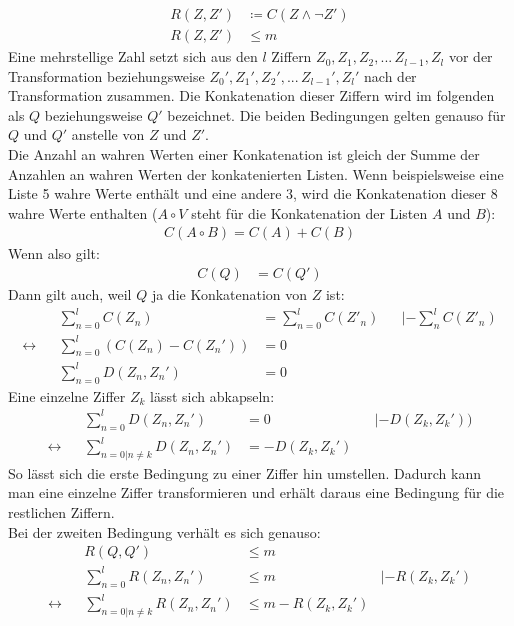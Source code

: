 \documentclass[a4paper,10pt,ngerman]{scrartcl}
\begin{document}
\begin{align}
R(Z, Z') &\coloneqq C(Z \land \neg Z') \\
R(Z, Z')&\leq m
\end{align}
Eine mehrstellige Zahl setzt sich aus den $l$ Ziffern $Z_0, Z_1, Z_2, ... \,Z_{l-1}, Z_l$ vor der Transformation beziehungsweise $Z_0', Z_1', Z_2', ... \,Z_{l-1}', Z_l'$ nach der Transformation zusammen.
Die Konkatenation dieser Ziffern wird im folgenden als $Q$ beziehungsweise $Q'$ bezeichnet. Die beiden Bedingungen gelten genauso für $Q$ und $Q'$ anstelle von $Z$ und $Z'$. \\
Die Anzahl an wahren Werten einer Konkatenation ist gleich der Summe der Anzahlen an wahren Werten der konkatenierten Listen. Wenn beispielsweise eine Liste 5 wahre Werte enthält und eine andere 3, wird die Konkatenation dieser 8 wahre Werte enthalten ($A\circ V$ steht für die Konkatenation der Listen $A$ und $B$):
\begin{align}
C(A \circ B) = C(A) + C(B)
\end{align}
Wenn also gilt:
\begin{align}
C(Q) &= C(Q')
\end{align}
Dann gilt auch, weil $Q$ ja die Konkatenation von $Z$ ist:
\begin{align}
&&\sum_{n=0}^l C(Z_n) &= \sum_{n=0}^l C(Z'_n)&& |-\sum_n^l C(Z'_n) \\
\leftrightarrow && \sum_{n=0}^l (C(Z_n) - C(Z_n')) &= 0 && \\
&& \sum_{n=0}^l D(Z_n, Z_n') &= 0 
\end{align}
Eine einzelne Ziffer $Z_k$ lässt sich abkapseln:
\begin{align}
&& \sum_{n=0}^l D(Z_n, Z_n') &= 0 && |-D(Z_k, Z_k')) \\
\leftrightarrow && \sum_{n=0|n \neq k}^l D(Z_n, Z_n') &= -D(Z_k, Z_k') &&
\end{align}
So lässt sich die erste Bedingung zu einer Ziffer hin umstellen. Dadurch kann man eine einzelne Ziffer transformieren und erhält daraus eine Bedingung für die restlichen Ziffern.\\
Bei der zweiten Bedingung verhält es sich genauso:
\begin{align}
&&R(Q, Q') &\leq m \\
&&\sum_{n=0}^l R(Z_n, Z_n') &\leq m & |-R(Z_k, Z_k') \\
\leftrightarrow && \sum_{n=0|n \neq k}^l R(Z_n, Z_n') &\leq m -R(Z_k, Z_k')
\end{align}
\end{document}
